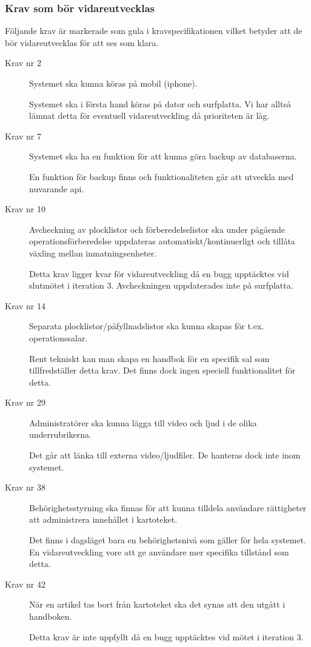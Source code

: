 \documentclass{article}
\begin{document}
\subsubsection{Krav som bör vidareutvecklas}
Följande krav är markerade som gula i kravspecifikationen vilket betyder att de bör vidareutvecklas för att ses som klara.
\begin{description}
\item[Krav nr 2] Systemet ska kunna köras på mobil (iphone).

Systemet ska i första hand köras på dator och surfplatta. Vi har alltså lämnat detta för eventuell vidareutveckling då prioriteten är låg.

\item[Krav nr 7] Systemet ska ha en funktion för att kunna göra backup av databaserna.

En funktion för backup finns och funktionaliteten går att utveckla med nuvarande api.%
\item[Krav nr 10] Avcheckning av plocklistor och förberedelselistor ska under pågående operationsförberedelse uppdateras automatiskt/kontinuerligt och tillåta växling mellan inmatningsenheter.

Detta krav ligger kvar för vidareutveckling då en bugg upptäcktes vid slutmötet i iteration 3. Avcheckningen uppdaterades inte på surfplatta.%
\item[Krav nr 14] Separata plocklistor/påfyllnadslistor ska kunna skapas för t.ex. operationssalar.

Rent tekniskt kan man skapa en handbok för en specifik sal som tillfredställer detta krav. Det finns dock ingen speciell funktionalitet för detta.
\item[Krav nr 29] Administratörer ska kunna lägga till video och ljud i de olika underrubrikerna.

Det går att länka till externa video/ljudfiler. De hanteras dock inte inom systemet. %
\item[Krav nr 38] Behörighetsstyrning ska finnas för att kunna tilldela användare rättigheter att administrera innehållet i kartoteket.

Det finns i dagsläget bara en behörighetsnivå som gäller för hela systemet. En vidareutveckling vore att ge användare mer specifika tillstånd som detta.
\item[Krav nr 42] När en artikel tas bort från kartoteket ska det synas att den utgått i handboken.

Detta krav är inte uppfyllt då en bugg upptäcktes vid mötet i iteration 3. %
\end{description}
\end{document}
